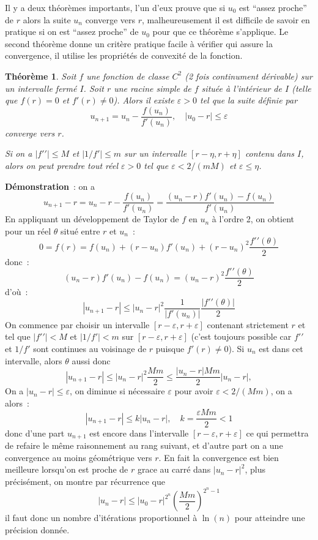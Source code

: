 \documentclass[a4paper,11pt]{article}
\newtheorem{thm}{Théorème}
\begin{document}
Il y a deux théorèmes importants, l'un d'eux prouve que
si $u_0$ est ``assez proche'' de $r$ alors la suite $u_n$ converge vers $r$,
malheureusement il est difficile de savoir en pratique si on est 
``assez proche'' de $u_0$ pour que ce théorème s'applique. Le second
théorème donne un critère pratique facile à vérifier qui assure
la convergence, il utilise les propriétés de convexité de la fonction.

\begin{thm} 
Soit $f$ une fonction de classe $C^2$ (2 fois continument dérivable)
sur un intervalle ferm\'e $I$. Soit $r$ une racine simple de $f$
situ\'ee \`a l'int\'erieur de $I$
(telle que $f(r)=0$ et $f'(r)\neq 0$). Alors il existe $\varepsilon>0$
tel que la suite définie par
\[ u_{n+1} = u_n -\frac{f(u_n)}{f'(u_n)}, \quad |u_0-r| \leq \varepsilon \]
converge vers $r$.

Si on a $|f'{'}| \leq M$ et $|1/f'| \leq m$ sur un intervalle 
$[r-\eta,r+\eta]$ contenu dans $I$, alors on peut prendre tout r\'eel
$\varepsilon>0$ tel que $\varepsilon < 2/(mM)$ et $\varepsilon \leq \eta$.
\end{thm}

{\bf Démonstration}~: on a
\[ u_{n+1}-r = u_n - r - \frac{f(u_n)}{f'(u_n)} = 
\frac{(u_n-r)f'(u_n)-f(u_n)}{f'(u_n)} \]
En appliquant un développement de Taylor de $f$ en $u_n$ à l'ordre 2,
on obtient pour un réel $\theta$
situé entre $r$ et $u_n$~:
\[ 0 = f(r)=f(u_n)+(r-u_n) f'(u_n) + (r-u_n)^2 \frac{f'{'}(\theta)}{2} \]
donc~:
\[ (u_n-r)f'(u_n)-f(u_n)= (u_n-r)^2 \frac{f'{'}(\theta)}{2} \]
d'o\`u~:
\[ |u_{n+1}-r| \leq |u_n-r|^2 \frac{1}{|f'(u_n)|} 
\frac{|f'{'}(\theta)|}{2} \]
On commence par choisir un intervalle $[r-\varepsilon,r+\varepsilon]$
contenant strictement $r$ et tel que $|f'{'}|<M$ et $|1/f'|<m$
sur $[r-\varepsilon,r+\varepsilon]$ (c'est toujours possible car
$f'{'}$ et $1/f'$ sont continues au voisinage de $r$ puisque $f'(r)\neq 0$).
Si $u_n$ est dans cet intervalle, alors $\theta$ aussi donc
\begin{equation}\label{eq:newton}
 |u_{n+1}-r| \leq |u_n-r|^2 \frac{Mm}{2} \leq  \frac{|u_n-r|Mm}{2}
|u_n-r|,  
\end{equation}
On a $|u_n-r| \leq \varepsilon$, on diminue si n\'ecessaire
$\varepsilon$ pour avoir $\varepsilon < 2/(Mm)$, on a alors~:
\[ |u_{n+1}-r| \leq k |u_n-r|, \quad k=\frac{\varepsilon Mm}{2}<1  \]
donc d'une part $u_{n+1}$ est encore dans l'intervalle 
$[r-\varepsilon,r+\varepsilon]$ 
ce qui permettra de refaire le m\^eme raisonnement au rang
suivant, et d'autre part
on a une convergence au moins géométrique vers $r$.
En fait la convergence est bien meilleure
lorsqu'on est proche de $r$ grace au carré dans $|u_n-r|^2$,
plus pr\'ecis\'ement, on montre par r\'ecurrence que
\[ |u_n-r| \leq |u_0 - r|^{2^n} \left( \frac{Mm}{2} \right)^{2^n-1}
\]
il faut donc un nombre d'it\'erations proportionnel \`a $\ln(n)$
pour atteindre une pr\'ecision donn\'ee.
\end{document}
